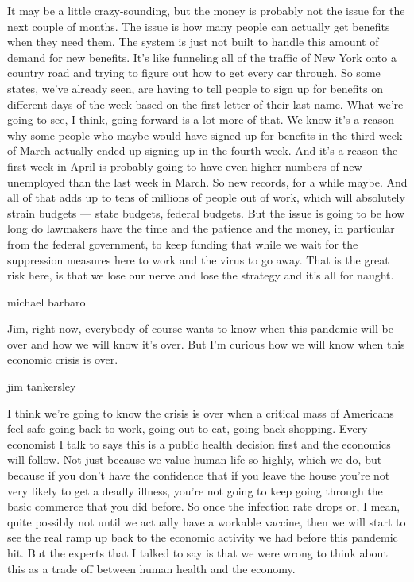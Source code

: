 It may be a little crazy-sounding, but the money is probably not the
issue for the next couple of months. The issue is how many people can
actually get benefits when they need them. The system is just not built
to handle this amount of demand for new benefits. It's like funneling
all of the traffic of New York onto a country road and trying to figure
out how to get every car through. So some states, we've already seen,
are having to tell people to sign up for benefits on different days of
the week based on the first letter of their last name. What we're going
to see, I think, going forward is a lot more of that. We know it's a
reason why some people who maybe would have signed up for benefits in
the third week of March actually ended up signing up in the fourth week.
And it's a reason the first week in April is probably going to have even
higher numbers of new unemployed than the last week in March. So new
records, for a while maybe. And all of that adds up to tens of millions
of people out of work, which will absolutely strain budgets --- state
budgets, federal budgets. But the issue is going to be how long do
lawmakers have the time and the patience and the money, in particular
from the federal government, to keep funding that while we wait for the
suppression measures here to work and the virus to go away. That is the
great risk here, is that we lose our nerve and lose the strategy and
it's all for naught.

michael barbaro

Jim, right now, everybody of course wants to know when this pandemic
will be over and how we will know it's over. But I'm curious how we will
know when this economic crisis is over.

jim tankersley

I think we're going to know the crisis is over when a critical mass of
Americans feel safe going back to work, going out to eat, going back
shopping. Every economist I talk to says this is a public health
decision first and the economics will follow. Not just because we value
human life so highly, which we do, but because if you don't have the
confidence that if you leave the house you're not very likely to get a
deadly illness, you're not going to keep going through the basic
commerce that you did before. So once the infection rate drops or, I
mean, quite possibly not until we actually have a workable vaccine, then
we will start to see the real ramp up back to the economic activity we
had before this pandemic hit. But the experts that I talked to say is
that we were wrong to think about this as a trade off between human
health and the economy.

